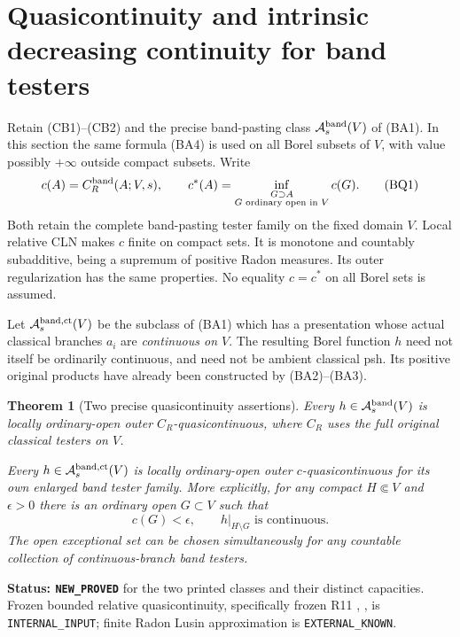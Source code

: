 \documentclass[11pt,a4paper]{article}
\numberwithin{equation}{section}
\newtheorem{theorem}{Theorem}[section]
\theoremstyle{definition}
\theoremstyle{remark}
\begin{document}


\section{Quasicontinuity and intrinsic decreasing continuity for band testers}
\label{sec:r12-band-quasicontinuity}

Retain (CB1)--(CB2) and the precise band-pasting class
$\mathcal A_s^{\rm band}(V)$ of (BA1). In this section the same
formula (BA4) is used on all Borel subsets of $V$, with value
possibly $+\infty$ outside compact subsets. Write
\[
 c(A)=C_R^{\rm band}(A;V,s),\qquad
 c^*(A)=\inf_{\substack{G\supset A\\G\text{ ordinary open in }V}}c(G).
 \tag{BQ1}
\]
Both retain the complete band-pasting tester family on the fixed
domain $V$. Local relative CLN makes $c$ finite on compact sets.
It is monotone and countably subadditive, being a supremum of
positive Radon measures. Its outer regularization has the same
properties. No equality $c=c^*$ on all Borel sets is assumed.

Let $\mathcal A_s^{\rm band,ct}(V)$ be the subclass of (BA1)
which has a presentation whose actual classical branches $a_i$
are \emph{continuous on $V$}. The resulting Borel function $h$
need not itself be ordinarily continuous, and need not be ambient
classical psh. Its positive original products have already been
constructed by (BA2)--(BA3).

\begin{theorem}[Two precise quasicontinuity assertions]
\label{thm:r12-band-quasicontinuity}
Every $h\in\mathcal A_s^{\rm band}(V)$ is locally
ordinary-open outer $C_R$-quasicontinuous, where $C_R$ uses
the full original classical testers on $V$.

Every $h\in\mathcal A_s^{\rm band,ct}(V)$ is locally
ordinary-open outer $c$-quasicontinuous for its own enlarged
band tester family. More explicitly, for any compact $H\Subset V$
and $\epsilon>0$ there is an ordinary open $G\subset V$ such
that
\[
                     c(G)<\epsilon,
                  \qquad h|_{H\setminus G}\text{ is continuous}.
 \tag{BQ2}
\]
The open exceptional set can be chosen simultaneously for any
countable collection of continuous-branch band testers.
\end{theorem}

\noindent\textbf{Status: \texttt{NEW\_PROVED}} for the two
printed classes and their distinct capacities. Frozen bounded
relative quasicontinuity, specifically frozen R11
,
, is
\texttt{INTERNAL\_INPUT}; finite
Radon Lusin approximation is \texttt{EXTERNAL\_KNOWN}.
\end{document}
